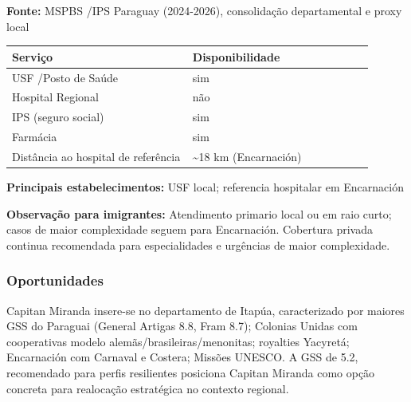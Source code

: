 \textbf{Fonte:} MSPBS /\allowbreak  IPS Paraguay (2024-2026), consolidação
departamental e proxy local

{\def\LTcaptype{none} %
\begin{longtable}{@{}>{\raggedright\arraybackslash}p{0.45\linewidth} >{\raggedright\arraybackslash}p{0.45\linewidth}@{}}
\toprule\noalign{}
Serviço & Disponibilidade \\
\midrule\noalign{}
\endhead
\bottomrule\noalign{}
\endlastfoot
USF /\allowbreak  Posto de Saúde & sim \\
Hospital Regional & não \\
IPS (seguro social) & sim \\
Farmácia & sim \\
Distância ao hospital de referência & \textasciitilde18 km
(Encarnación) \\
\end{longtable}
}

\textbf{Principais estabelecimentos:} USF local; referencia hospitalar
em Encarnación

\textbf{Observação para imigrantes:} Atendimento primario local ou em
raio curto; casos de maior complexidade seguem para Encarnación.
Cobertura privada continua recomendada para especialidades e urgências
de maior complexidade.
\newpage

\subsubsection*{Oportunidades}\label{oport-capitan-miranda-0705}
Capitan Miranda insere-se no departamento de Itapúa, caracterizado por maiores GSS do Paraguai (General Artigas 8.8, Fram 8.7); Colonias Unidas com cooperativas modelo alemãs/brasileiras/menonitas; royalties Yacyretá; Encarnación com Carnaval e Costera; Missões UNESCO. A GSS de 5.2, recomendado para perfis resilientes posiciona Capitan Miranda como opção concreta para realocação estratégica no contexto regional.

